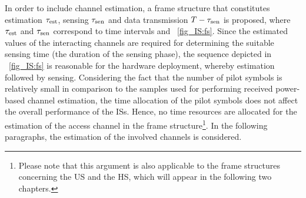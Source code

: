 In order to include channel estimation, a frame structure that constitutes estimation $\tau_{\text{est}}$, sensing $\tau_{\text{sen}}$ and data transmission $T - \tau_{\text{sen}}$ is proposed, where $\tau_{\text{est}}$ and $\tau_{\text{sen}}$ correspond to time intervals and  \figurename~{\ref{fig_IS:fs}}. Since the estimated values of the interacting channels are required for determining the suitable sensing time (the duration of the sensing phase), the sequence depicted in \figurename~{\ref{fig_IS:fs}} is reasonable for the hardware deployment, whereby estimation followed by sensing. 
Considering the fact that the number of pilot symbols is relatively small in comparison to the samples used for performing received power-based channel estimation, the time allocation of the pilot symbols does not affect the overall performance of the ISs. Hence, no time resources are allocated for the estimation of the access channel in the frame structure\footnote{Please note that this argument is also applicable to the frame structures concerning the US and the HS, which will appear in the following two chapters.}. In the following paragraphs, the estimation of the involved channels is considered. 


